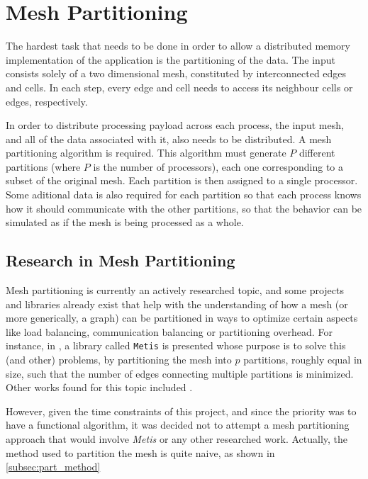 \section{Mesh Partitioning}
\label{sec:partitioning}

The hardest task that needs to be done in order to allow a distributed memory implementation of the application is the partitioning of the data. The input consists solely of a two dimensional mesh, constituted by interconnected edges and cells. In each step, every edge and cell needs to access its neighbour cells or edges, respectively.

In order to distribute processing payload across each process, the input mesh, and all of the data associated with it, also needs to be distributed. A mesh partitioning algorithm is required. This algorithm must generate $P$ different partitions (where $P$ is the number of processors), each one corresponding to a subset of the original mesh. Each partition is then assigned to a single processor. Some aditional data is also required for each partition so that each process knows how it should communicate with the other partitions, so that the behavior can be simulated as if the mesh is being processed as a whole.

\subsection{Research in Mesh Partitioning}
\label{subsec:part_research}

Mesh partitioning is currently an actively researched topic, and some projects and libraries already exist that help with the understanding of how a mesh (or more generically, a graph) can be partitioned in ways to optimize certain aspects like load balancing, communication balancing or partitioning overhead. For instance, in \cite{metis}, a library called \texttt{Metis} is presented whose purpose is to solve this (and other) problems, by partitioning the mesh into $p$ partitions, roughly equal in size, such that the number of edges connecting multiple partitions is minimized. Other works found for this topic included \cite{gilbert1995,walshaw2000}.

However, given the time constraints of this project, and since the priority was to have a functional algorithm, it was decided not to attempt a mesh partitioning approach that would involve \textit{Metis} or any other researched work. Actually, the method used to partition the mesh is quite naive, as shown in \cref{subsec:part_method}

